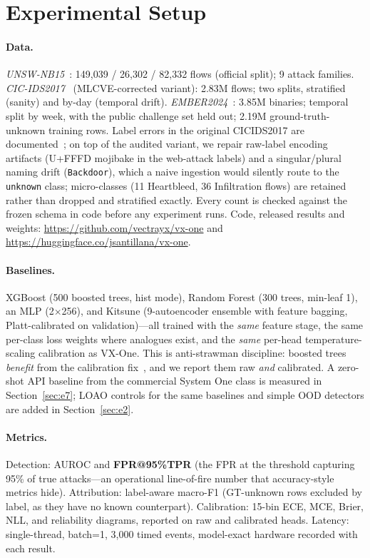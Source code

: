 \documentclass[sigconf,anonymous=false]{acmart}
\newcommand{\code}[1]{{\footnotesize\url{#1}}}
\begin{document}
\section{Experimental Setup}
\label{sec:setup}

\paragraph{Data.} \emph{UNSW-NB15}~\cite{moustafa2015unsw}: 149{,}039 / 26{,}302 / 82{,}332 flows (official split); 9 attack families. \emph{CIC-IDS2017}~\cite{sharafaldin2018cicids} (MLCVE-corrected variant): 2.83M flows; two splits, stratified (sanity) and by-day (temporal drift). \emph{EMBER2024}~\cite{joyce2025ember}: 3.85M binaries; temporal split by week, with the public challenge set held out; 2.19M ground-truth-unknown training rows. Label errors in the original CICIDS2017 are documented~\cite{engelen2021,lanvin2022errors}; on top of the audited variant, we repair raw-label encoding artifacts (U+FFFD mojibake in the web-attack labels) and a singular/plural naming drift (\texttt{Backdoor}), which a naive ingestion would silently route to the \texttt{unknown} class; micro-classes (11 Heartbleed, 36 Infiltration flows) are retained rather than dropped and stratified exactly. Every count is checked against the frozen schema in code before any experiment runs. Code, released results and weights: \code{https://github.com/vectrayx/vx-one} and \code{https://huggingface.co/jsantillana/vx-one}.

\paragraph{Baselines.} XGBoost (500 boosted trees, hist mode), Random Forest (300 trees, min-leaf 1), an MLP (2$\times$256), and Kitsune (9-autoencoder ensemble with feature bagging, Platt-calibrated on validation)---all trained with the \emph{same} feature stage, the same per-class loss weights where analogues exist, and the \emph{same} per-head temperature-scaling calibration as VX-One. This is anti-strawman discipline: boosted trees \emph{benefit} from the calibration fix~\cite{niculescu2005}, and we report them raw \emph{and} calibrated. A zero-shot API baseline from the commercial System One class is measured in Section~\ref{sec:e7}; LOAO controls for the same baselines and simple OOD detectors are added in Section~\ref{sec:e2}.

\paragraph{Metrics.} Detection: AUROC and \textbf{FPR@95\%TPR} (the FPR at the threshold capturing 95\% of true attacks---an operational line-of-fire number that accuracy-style metrics hide). Attribution: label-aware macro-F1 (GT-unknown rows excluded by label, as they have no known counterpart). Calibration: 15-bin ECE, MCE, Brier, NLL, and reliability diagrams, reported on raw and calibrated heads. Latency: single-thread, batch=1, 3{,}000 timed events, model-exact hardware recorded with each result.
\end{document}
